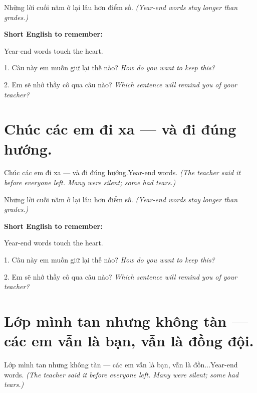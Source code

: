 \begin{baihoc}
Những lời cuối năm ở lại lâu hơn điểm số.
\textit{(Year-end words stay longer than grades.)}
\end{baihoc}

\begin{ghinhoanh}
\textbf{Short English to remember:}

Year-end words touch the heart.

\end{ghinhoanh}

\begin{tuhocnhanh}
1. Câu này em muốn giữ lại thế nào? \textit{How do you want to keep this?}

2. Em sẽ nhớ thầy cô qua câu nào? \textit{Which sentence will remind you of your teacher?}
\end{tuhocnhanh}
\ngancach


\section{Chúc các em đi xa — và đi đúng hướng.}
\begin{truyen}{Chúc các em đi xa — và đi đúng hướng.}{Year-end words.}
\textit{(The teacher said it before everyone left. Many were silent; some had tears.)}
\end{truyen}

\begin{baihoc}
Những lời cuối năm ở lại lâu hơn điểm số.
\textit{(Year-end words stay longer than grades.)}
\end{baihoc}

\begin{ghinhoanh}
\textbf{Short English to remember:}

Year-end words touch the heart.

\end{ghinhoanh}

\begin{tuhocnhanh}
1. Câu này em muốn giữ lại thế nào? \textit{How do you want to keep this?}

2. Em sẽ nhớ thầy cô qua câu nào? \textit{Which sentence will remind you of your teacher?}
\end{tuhocnhanh}
\ngancach


\section{Lớp mình tan nhưng không tàn — các em vẫn là bạn, vẫn là đồng đội.}
\begin{truyen}{Lớp mình tan nhưng không tàn — các em vẫn là bạn, vẫn là đồn...}{Year-end words.}
\textit{(The teacher said it before everyone left. Many were silent; some had tears.)}
\end{truyen}

